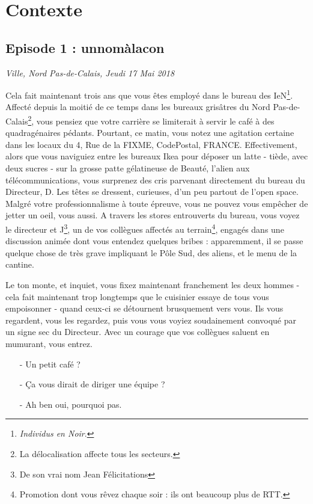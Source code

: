 \newpage

\section{Contexte}
\subsection{Episode 1 : unnomàlacon}
\hfill \textit{Ville, Nord Pas-de-Calais, Jeudi 17 Mai 2018}

Cela fait maintenant trois ans que vous êtes employé dans le bureau des
IeN\footnote{\emph{Individus en Noir}\texttrademark.}.
Affecté depuis la moitié de ce temps dans les
bureaux grisâtres du Nord Pas-de-Calais\footnote{La délocalisation affecte tous
les secteurs.}, vous pensiez que votre carrière se limiterait à servir le café à des
quadragénaires pédants. 
Pourtant, ce matin, vous notez une agitation certaine dans les locaux du 4, Rue
de la FIXME, CodePostal, FRANCE. %
Effectivement, alors que vous naviguiez entre les bureaux Ikea pour déposer un
latte - tiède, avec deux sucres - sur la grosse patte gélatineuse de
Beauté, l'alien aux télécommunications, vous surprenez des cris parvenant directement du bureau du
Directeur, D. Les têtes se dressent, curieuses, d'un peu partout de
l'open space. Malgré votre professionnalisme à toute épreuve, vous ne pouvez
vous empêcher de jetter un oeil, vous aussi. A travers les stores entrouverts
du bureau, vous voyez le directeur et J\footnote{De son vrai nom Jean
Félicitations}, un de vos collègues affectés au terrain\footnote{Promotion dont vous
rêvez chaque soir : ils ont beaucoup plus de RTT.}, engagés dans une discussion animée dont vous entendez
quelques bribes : apparemment, il se passe quelque chose de très grave
impliquant le Pôle Sud, des aliens, et le menu de la cantine.

Le ton monte, et inquiet, vous fixez maintenant franchement les deux hommes -
cela fait maintenant trop longtemps que le cuisinier essaye de tous vous
empoisonner - quand ceux-ci se détournent brusquement vers vous. Ils vous
regardent, vous les regardez, puis vous vous voyiez soudainement convoqué par
un signe sec du Directeur. Avec un courage que vos collègues saluent en
mumurant, vous entrez.

\begin{itemize}
\item[-] Un petit café ?
\item[-] Ça vous dirait de diriger une équipe ?
\item[-] Ah ben oui, pourquoi pas.
\end{itemize}

